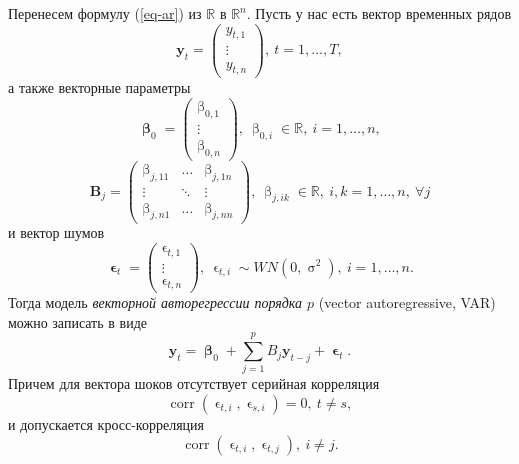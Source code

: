 \documentclass[a4paper, 14pt]{extreport}
\numberwithin{equation}{section}
\newcommand{\Rm}{\mathbb{R}}
\renewcommand{\beta}{\upbeta}
\renewcommand{\epsilon}{\upvarepsilon}
\renewcommand{\sigma}{\upsigma}
\newcommand{\corr}{\operatorname{corr}}
\numberwithin{equation}{section}
\begin{document}
	Перенесем формулу (\ref{eq-ar}) из $\Rm$ в $\Rm^n$. Пусть у нас есть вектор временных рядов 
	\begin{equation*}
	\mathbf y_t = \begin{pmatrix}
		y_{t,1} \\ \vdots \\ y_{t,n}
	\end{pmatrix},\ t = 1,\ldots, T,
	\end{equation*}
	а также векторные параметры
	\begin{equation*}
		\mathbf \beta_0 = \begin{pmatrix}
			\beta_{0,1} \\ \vdots \\ \beta_{0, n}
		\end{pmatrix},\ \beta_{0, i} \in \mathbb R,\ i=1,\ldots,n,
	\end{equation*}
	\begin{equation*}
		\mathbf B_j = \begin{pmatrix}
			\beta_{j, 11} & \ldots & \beta_{j, 1n} \\
			\vdots & \ddots & \vdots \\
			\beta_{j, n1} & \ldots & \beta_{j, nn}
		\end{pmatrix},\ \beta_{j, ik} \in \mathbb R,\ i,k = 1,\ldots,n,\ \forall j
	\end{equation*}
	и вектор шумов
	\begin{equation*}
		\mathbf \epsilon_t = \begin{pmatrix}
			\epsilon_{t,1} \\ \vdots \\ \epsilon_{t,n}
		\end{pmatrix},\ \epsilon_{t,i} \sim WN(0,\sigma^2),\ i = 1,\ldots, n.
	\end{equation*}
	Тогда модель \textit{векторной авторегрессии порядка $p$} (vector autoregressive, VAR) можно записать в виде
	\begin{equation}\label{eq:var}
	\mathbf y_t = \mathbf \beta_0 + \sum_{j=1}^{p}B_j\mathbf y_{t-j} + \mathbf\epsilon_t.
	\end{equation}
	Причем для вектора шоков отсутствует серийная корреляция \begin{equation}
		\corr (\epsilon_{t,i}, \epsilon_{s,i}) = 0,\ t\ne s,
	\end{equation} 
	и допускается кросс-корреляция 
	\begin{equation}
		\corr(\epsilon_{t,i}, \epsilon_{t,j}),\ i \ne j.
	\end{equation}
	
\end{document}
